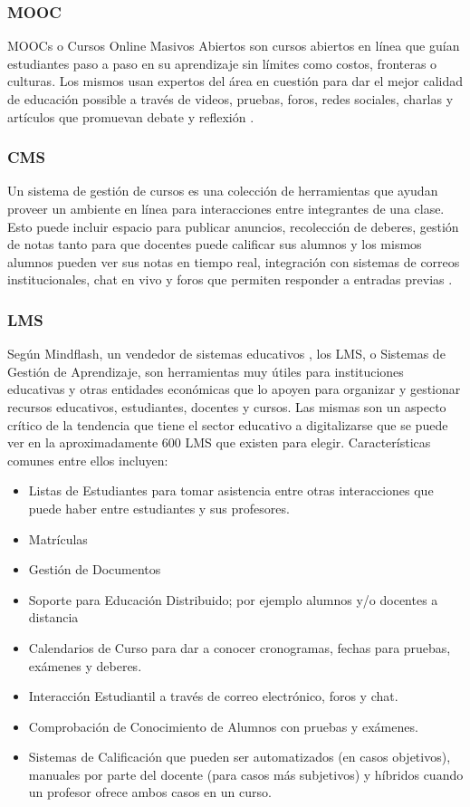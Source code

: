 \subsubsection{MOOC}
MOOCs o Cursos Online Masivos Abiertos son cursos abiertos en línea que guían estudiantes paso a paso en su aprendizaje sin límites como costos, fronteras o culturas. Los mismos usan expertos del área en cuestión para dar el mejor calidad de educación possible a través de videos, pruebas, foros, redes sociales, charlas y artículos que promuevan debate y reflexión \citep{UEA-What-is-a-MOOC}.

\subsubsection{CMS}
Un sistema de gestión de cursos es una colección de herramientas que ayudan proveer un ambiente en línea para interacciones entre integrantes de una clase. Esto puede incluir espacio para publicar anuncios, recolección de deberes, gestión de notas tanto para que docentes puede calificar sus alumnos y los mismos alumnos pueden ver sus notas en tiempo real, integración con sistemas de correos institucionales, chat en vivo y foros que permiten responder a entradas previas  \citep{Vanderbilt-Course-Management-Systems}.

\subsubsection{LMS}
Según Mindflash, un vendedor de sistemas educativos \citep{MINDFLASH-ABOUT}, los LMS, o Sistemas de Gestión de Aprendizaje, son herramientas muy útiles para instituciones educativas y otras entidades económicas que lo apoyen para organizar y gestionar recursos educativos, estudiantes, docentes y cursos. Las mismas son un aspecto crítico de la tendencia que tiene el sector educativo a digitalizarse que se puede ver en la aproximadamente 600 LMS  que existen para elegir. Características comunes entre ellos incluyen: \citep{MINDFLASH-LMS}
\begin{itemize}
	\item Listas de Estudiantes para tomar asistencia entre otras interacciones que puede haber entre estudiantes y sus profesores.
    \item Matrículas
    \item Gestión de Documentos
    \item Soporte para Educación Distribuido; por ejemplo alumnos y/o docentes a distancia
    \item Calendarios de Curso para dar a conocer cronogramas, fechas para pruebas, exámenes y deberes.
    \item Interacción Estudiantil a través de correo electrónico, foros y chat.
    \item Comprobación de Conocimiento de Alumnos con pruebas y exámenes.
    \item Sistemas de Calificación que pueden ser automatizados (en casos objetivos), manuales por parte del docente (para casos más subjetivos) y híbridos cuando un profesor ofrece ambos casos en un curso.
\end{itemize}


